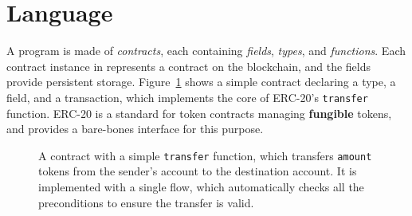 \documentclass[nonacm, dvipsnames, sigconf]{acmart}
\begin{document}
\section{Language}\label{sec:lang}
A \langName program is made of \emph{contracts}, each containing \emph{fields}, \emph{types}, and \emph{functions}.
Each contract instance in \langName represents a contract on the blockchain, and the fields provide persistent storage.
Figure~\ref{fig:erc20-transfer-flow} shows a simple contract declaring a type, a field, and a transaction, which implements the core of ERC-20's \lstinline{transfer} function.
ERC-20 is a standard for token contracts managing \textbf{fungible} tokens, and provides a bare-bones interface for this purpose.
\begin{figure}[!b]
    \centering
    
    \caption{A \langName contract with a simple \lstinline{transfer} function, which transfers \lstinline{amount} tokens from the sender's account to the destination account.
It is implemented with a single flow, which automatically checks all the preconditions to ensure the transfer is valid.}
    \label{fig:erc20-transfer-flow}
\end{figure}
\end{document}
